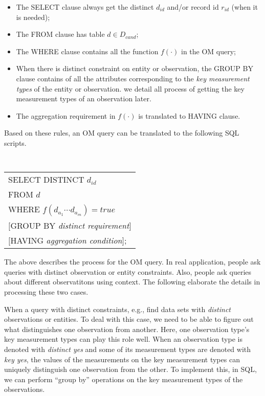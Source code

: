 \begin{itemize}
\item The SELECT clause always get the distinct $d_{id}$ and/or
  record id $r_{id}$ (when it is needed);
\item The FROM clause has table $d \in D_{cand}$;
\item The WHERE clause contains all the function $f(\cdot)$ in the OM
  query;
\item When there is distinct constraint on entity or observation, the
  GROUP BY clause contains of all the attributes corresponding to the
  {\em key measurement types} of the entity or observation. we detail
  all process of getting the key measurement types of an observation
  later.
\item The aggregation requirement in $f(\cdot)$ is translated to
  HAVING clause.
\end{itemize}

Based on these rules, an OM query can be translated to the following
SQL scripts.

\vspace{0.1in}
{\tt
\begin{tabular}{l}
SELECT DISTINCT $d_{id}$\\
FROM $d$\\
WHERE $f(d_{a_1} \cdots d_{a_m}) = true$\\
$[$GROUP BY {\em distinct requirement}$]$\\
$[$HAVING {\em aggregation condition}$]$;
\end{tabular}
}
\vspace{0.1in}

The above describes the process for the OM query.
In real application, people ask queries with distinct
observation or entity constraints. Also, people ask queries about
different observatitons using context.
The following elaborate the details in processing these two cases.

When a query with distinct constraints, e.g., find data sets with {\em distinct} observations or
entities. To deal with this case,
we need to be able to figure out what distinguishes one observation
from another. Here, one observation type's key measurement types can
play this role well.
When an observation type is denoted with {\em distinct yes} and some
of its measurement types are denoted with {\em key yes},
the values of the measurements on the key measurement types can
uniquely distinguish one observation from the other.
To implement this, in SQL, we can perform ``group by'' operations on
the key measurement types of the observations.

